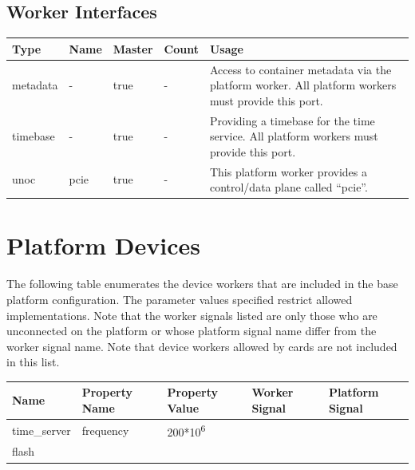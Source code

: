 \documentclass{article}
\begin{document}
\begin{landscape}
	\section*{Worker Interfaces}
	\begin{scriptsize}
		\begin{tabular}{|M{2cm}|M{2cm}|M{1.5cm}|M{1.5cm}|M{14.5cm}|}
			\hline
			Type       & Name & Master & Count & Usage                  \\
			\hline
			metadata   & -    & true   & -     & Access to container metadata via the platform worker. All platform workers must provide this port. \\
			\hline
			timebase   & -    & true   & -     & Providing a timebase for the time service. All platform workers must provide this port. \\
			\hline
			unoc       & pcie & true   & -     & This platform worker provides a control/data plane called ``pcie''. \\
			\hline
		\end{tabular}
	\end{scriptsize}

\end{landscape}
\pagebreak

\section*{Platform Devices}
The following table enumerates the device workers that are included in the base platform configuration. The parameter values specified restrict allowed implementations. Note that the worker signals listed are only those who are unconnected on the platform or whose platform signal name differ from the worker signal name. Note that device workers allowed by cards are not included in this list. \\ \newline
\begin{tabular}{|M{3cm}|M{3.5cm}|M{3cm}|M{3cm}|M{3cm}|}
	\hline
	Name                       & Property Name    & Property Value              & Worker Signal & Platform Signal         \\
	\hline
	time\_server               & frequency        & 200*10\textsuperscript{6}   &               &                         \\
	\hline
	flash &   &   &  &  \\
	\hline
\end{tabular}
\end{document}
